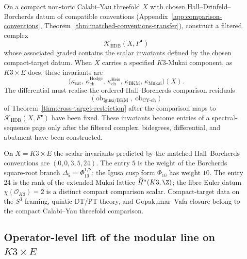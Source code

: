\documentclass[11pt]{memoir}
\begin{document}
\begin{conj}\label{conj:hall-drinfeld-borcherds-ss}
  On a compact non-toric Calabi--Yau threefold \(X\) with chosen
  Hall--Drinfeld--Borcherds datum of compatible conventions
  (Appendix~\ref{app:comparison-conventions},
  Theorem~\ref{thm:matched-conventions-transfer}), construct a filtered
  complex
  \[
    \mathcal K_{\mathrm{HDB}}(X,F^\bullet)
  \]
	  whose associated graded contains the scalar invariants defined by the
	  chosen compact-target datum.  When \(X\) carries a specified
	  \(K3\)-Mukai component, as \(K3\times E\) does, these invariants are
	  \[
	    \bigl(\kappa_{\mathrm{cat}},\,\kappa^{\mathrm{Hodge}}_{\mathrm{ch}},\,
	    \kappa^{\mathrm{Heis}}_{\mathrm{ch}},\,
	    \kappa_{\mathrm{BKM}},\,\kappa_{\mathrm{Mukai}}\bigr)(X).
	  \]
  The differential must realise the ordered Hall--Borcherds comparison
  residuals
  \[
    \bigl(\operatorname{ob}_{\mathrm{Igusa/BKM}},
    \operatorname{ob}_{\mathrm{CY\mbox{-}ch}}\bigr)
  \]
  of Theorem~\ref{thm:cross-target-restriction} after the comparison
  maps to \(\mathcal K_{\mathrm{HDB}}(X,F^\bullet)\) have been fixed.
  These invariants become entries of a spectral-sequence page only after
  the filtered complex, bidegrees, differential, and abutment have been
  constructed.
\end{conj}
On \(X=K3\times E\) the scalar invariants predicted by the matched
Hall--Borcherds conventions are
\((0,0,3,5,24)\).  The entry \(5\) is the weight of the Borcherds
square-root branch \(\Delta_5=\Phi_{10}^{1/2}\); the Igusa cusp form
\(\Phi_{10}\) has weight \(10\).  The entry \(24\) is the rank of the
extended Mukai lattice \(\widetilde H^*(K3,\Z)\); the fibre Euler datum
\(\chi(\mathcal O_{K3})=2\) is a distinct compact comparison scalar.
Compact-target
data on the $S^3$ framing, quintic DT/PT theory, and Gopakumar--Vafa
closure belong to the compact Calabi--Yau threefold comparison.

\subsection{Operator-level lift of the modular line on
  \texorpdfstring{$K3\times E$}{K3 x E}}\label{ssec:open-modular-lift}
\end{document}

